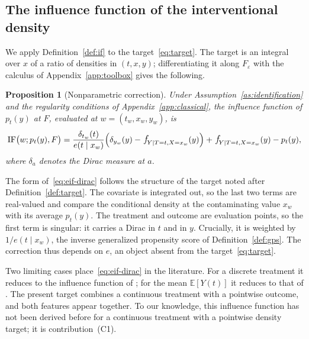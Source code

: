 \documentclass[11pt]{article}
\theoremstyle{plain}
\newtheorem{mypropo}{Proposition}
\theoremstyle{definition}
\theoremstyle{remark}
\newcommand{\pE}{\ensuremath{\mathbb{E}}}
\newcommand{\pf}[1]{\ensuremath{\,\mathlarger{\textit{f}}_{#1}}}
\newcommand{\IF}{\mathrm{IF}}
\newcommand{\gps}{e}
\begin{document}
\subsection{The influence function of the interventional density}
\label{sec:eif-classical}

We apply Definition~\ref{def:if} to the target~\eqref{eq:target}. The target is an integral
over $x$ of a ratio of densities in $(t,x,y)$; differentiating it along $F_\varepsilon$
with the calculus of Appendix~\ref{app:toolbox} gives the following.

\begin{mypropo}[Nonparametric correction]
\label{prop:eif}
Under Assumption~\ref{as:identification} and the regularity conditions of
Appendix~\ref{app:classical}, the influence function of $p_t(y)$ at $F$, evaluated at
$w = (t_w,x_w,y_w)$, is
\begin{equation}
\IF\big(w; p_t(y), F\big)
= \frac{\delta_{t_w}(t)}{\gps(t \mid x_w)}
\Big( \delta_{y_w}(y) - \pf{Y \mid T=t,X=x_w}(y) \Big)
+ \pf{Y \mid T=t,X=x_w}(y) - p_t(y),
\label{eq:eif-dirac}
\end{equation}
where $\delta_a$ denotes the Dirac measure at $a$.
\end{mypropo}

The form of~\eqref{eq:eif-dirac} follows the structure of the target noted after
Definition~\ref{def:target}. The covariate is integrated out, so the last two terms are
real-valued and compare the conditional density at the contaminating value $x_w$ with its
average $p_t(y)$. The treatment and outcome are evaluation points, so the first term is
singular: it carries a Dirac in $t$ and in $y$. Crucially, it is weighted by
$1/\gps(t\mid x_w)$, the inverse generalized propensity score of Definition~\ref{def:gps}.
The correction thus depends on $\gps$, an object absent from the target~\eqref{eq:target}.

Two limiting cases place~\eqref{eq:eif-dirac} in the literature. For a discrete treatment
it reduces to the influence function of \citet{kennedy2023density}; for the mean
$\pE[Y(t)]$ it reduces to that of \citet{kennedy2017continuous}. The present target
combines a continuous treatment with a pointwise outcome, and both features appear
together. To our knowledge, this influence function has not been derived before for a
continuous treatment with a pointwise density target; it is contribution~(C1).
\end{document}
